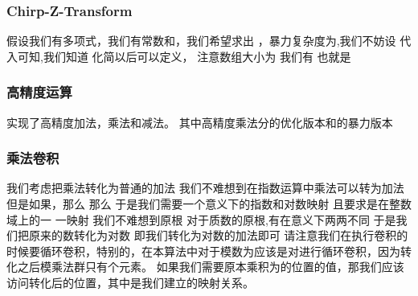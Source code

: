 \documentclass[8pt,a4paper]{article}
\newcommand{\code}[1]{
    
}
\newcommand{\txt}[1]{\par\noindent\footnotesize #1}
\newcommand{\inlineformula}[1]{\ensuremath{}}
\begin{document}
\begin{multicols}{2}
        \subsubsection{Chirp-Z-Transform}
            \txt{假设我们有多项式\inlineformula{./assets/formulas_tex/formula_432.tex}，我们有常数\inlineformula{./assets/formulas_tex/formula_433.tex}和\inlineformula{./assets/formulas_tex/formula_434.tex}，我们希望求出
\inlineformula{./assets/formulas_tex/formula_435.tex}，暴力复杂度为\inlineformula{./assets/formulas_tex/formula_436.tex},我们不妨设\inlineformula{./assets/formulas_tex/formula_437.tex}
代入可知\inlineformula{./assets/formulas_tex/formula_438.tex},我们知道\inlineformula{./assets/formulas_tex/formula_439.tex}
化简以后可以定义\inlineformula{./assets/formulas_tex/formula_440.tex}，\inlineformula{./assets/formulas_tex/formula_441.tex}
注意\inlineformula{./assets/formulas_tex/formula_442.tex}数组大小为\inlineformula{./assets/formulas_tex/formula_443.tex}
我们有\inlineformula{./assets/formulas_tex/formula_444.tex}
也就是\inlineformula{./assets/formulas_tex/formula_445.tex}}
            \code{src/number_theory/随机化算法_5_5.cpp}
        \subsubsection{高精度运算}
            \txt{实现了高精度加法，乘法和减法。
其中高精度乘法分\inlineformula{./assets/formulas_tex/formula_446.tex}的\inlineformula{./assets/formulas_tex/formula_447.tex}优化版本和\inlineformula{./assets/formulas_tex/formula_448.tex}的暴力版本}
            \code{src/number_theory/随机化算法_6_5.cpp}
        \subsubsection{乘法卷积}
            \txt{我们考虑把乘法转化为普通的加法 我们不难想到在指数运算中乘法可以转为加法
但是如果\inlineformula{./assets/formulas_tex/formula_449.tex}，那么\inlineformula{./assets/formulas_tex/formula_450.tex} 那么\inlineformula{./assets/formulas_tex/formula_451.tex}
于是我们需要一个\inlineformula{./assets/formulas_tex/formula_452.tex}意义下的指数和对数映射 且要求是在整数域上的一 一映射
我们不难想到原根 对于质数\inlineformula{./assets/formulas_tex/formula_453.tex}的原根\inlineformula{./assets/formulas_tex/formula_454.tex},有\inlineformula{./assets/formulas_tex/formula_455.tex}在\inlineformula{./assets/formulas_tex/formula_456.tex}意义下两两不同
于是我们把原来的数转化为对数 即\inlineformula{./assets/formulas_tex/formula_457.tex}我们转化为对数的加法即可
请注意我们在执行卷积的时候要循环卷积，特别的，在本算法中对于模数为\inlineformula{./assets/formulas_tex/formula_458.tex}应该是对\inlineformula{./assets/formulas_tex/formula_459.tex}进行循环卷积，因为转化之后模\inlineformula{./assets/formulas_tex/formula_460.tex}乘法群只有\inlineformula{./assets/formulas_tex/formula_461.tex}个元素。
如果我们需要原本乘积为\inlineformula{./assets/formulas_tex/formula_462.tex}的位置的值，那我们应该访问转化后的\inlineformula{./assets/formulas_tex/formula_463.tex}位置，其中\inlineformula{./assets/formulas_tex/formula_464.tex}是我们建立的映射关系。}
            \code{src/number_theory/随机化算法_7_5.cpp}

\end{multicols}
\end{document}

